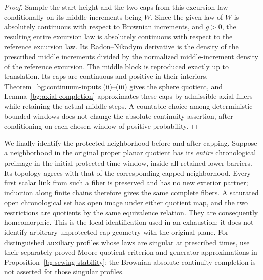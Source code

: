 \begin{proof}
Sample the start height and the two caps from this excursion law
conditionally on its middle increments being $W$. Since the given
law of $W$ is absolutely continuous with respect to Brownian
increments, and $g>0$, the resulting entire excursion law is
absolutely continuous with respect to the reference excursion law.
Its Radon--Nikodym derivative is the density of the prescribed middle
increments divided by the normalized middle-increment density of the
reference excursion. The middle block is reproduced exactly up to
translation. Its caps are continuous and positive in their interiors.
Theorem~\ref{bg:continuum-inputs}(ii)--(iii) gives the sphere quotient, and
Lemma~\ref{bg:axial-completion} approximates these caps by admissible
axial fillers while retaining the actual middle steps. A countable
choice among deterministic bounded windows does not change the
absolute-continuity assertion, after conditioning on each chosen
window of positive probability.
\end{proof}

We finally identify the protected neighborhood before and after
capping. Suppose a neighborhood in the original proper planar
quotient has its \emph{entire} chronological preimage in the initial
protected time window, inside all retained lower barriers. Its
topology agrees with that of the corresponding capped neighborhood.
Every first scalar link from such a fiber is preserved and has no
new exterior partner; induction along finite chains therefore gives
the same complete fibers. A saturated open chronological set has
open image under either quotient map, and the two restrictions are
quotients by the same equivalence relation. They are consequently
homeomorphic. This is the local identification used in an exhaustion;
it does not identify arbitrary unprotected cap geometry with the
original plane. For distinguished auxiliary profiles whose laws
are singular at prescribed times, use their separately proved Moore
quotient criterion and generator approximations in
Proposition~\ref{bg:sewing-stability}; the Brownian absolute-continuity
completion is not asserted for those singular profiles.
